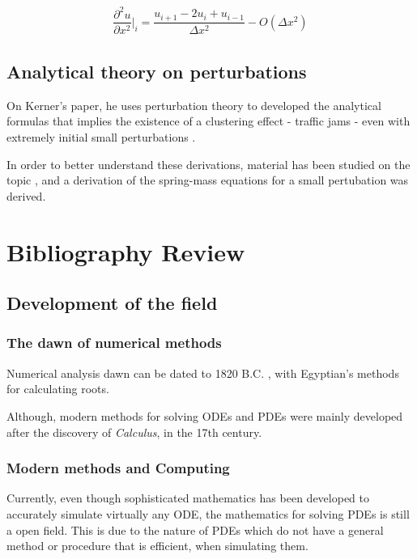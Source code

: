 \documentclass[11pt]{article}
\begin{document}
\begin{equation}
\begin{aligned}
\dfrac{\partial^2{u}}{\partial{x^2}}\biggr\rvert_i = \dfrac{u_{i+1}-2u_i+u_{i-1}}{\Delta{x^2}} - O(\Delta{x^2})
\end{aligned}
\end{equation}

\subsection{Analytical theory on perturbations}
\label{sec:org6fbf713}
On Kerner's paper, he uses perturbation theory to developed the analytical
formulas that implies the existence of a clustering effect - traffic jams - even
with extremely initial small perturbations \cite{kerner1993}.

In order to better understand these derivations, material has been studied on
the topic \cite{tremblay2017phy}, and a derivation of the spring-mass equations for a small pertubation
was derived.

\section{Bibliography Review}
\label{sec:org2719cf8}
\subsection{Development of the field}
\label{sec:org31837ad}
\subsubsection{The dawn of numerical methods}
\label{sec:orga09f713}
Numerical analysis dawn can be dated to
1820 B.C. \cite{smith1930rhind}, with Egyptian's methods for
calculating roots.

Although, modern methods for solving ODEs and PDEs were mainly
developed after the discovery of \emph{Calculus}, in the 17th century.

\subsubsection{Modern methods and Computing}
\label{sec:orgecc9594}
Currently, even though sophisticated mathematics has been
developed to accurately simulate virtually any ODE, the mathematics
for solving PDEs is still a open field. This is due to the nature of
PDEs which do not have a general method or procedure that is
efficient, when simulating them.
\end{document}
